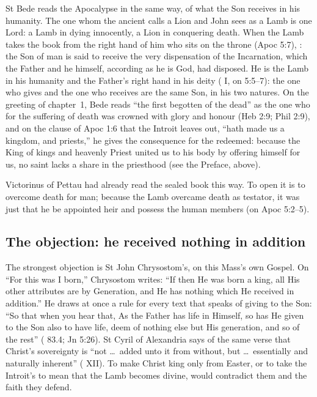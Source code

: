 St Bede reads the Apocalypse in the same way, of what the Son receives in his
humanity. The one whom the ancient calls a Lion and John sees as a Lamb is one
Lord: a Lamb in dying innocently, a Lion in conquering death. When the Lamb
takes the book from the right hand of him who sits on the throne (Apoc 5:7),
: the Son of man is said
to receive the very dispensation of the Incarnation, which the Father and he
himself, according as he is God, had disposed. He is the Lamb in his humanity
and the Father's right hand in his deity ( I, on
5:5--7): the one who gives and the one who receives are the same Son, in his
two natures. On the greeting of chapter~1, Bede reads ``the first begotten of the
dead'' as the one who for the suffering of death was crowned with glory and
honour (Heb 2:9; Phil 2:9), and on the clause of Apoc 1:6 that the Introit
leaves out, ``hath made us a kingdom, and priests,'' he gives the consequence
for the redeemed: because the King of kings and heavenly Priest united us to
his body by offering himself for us, no saint lacks a share in the priesthood
(see the Preface, above).

Victorinus of Pettau had already read the sealed book this way. To open it is
to overcome death for man; because the Lamb overcame death as testator, it was
just that he be appointed heir and possess the human members (on Apoc
5:2--5).

\subsection{The objection: he received nothing in addition}
\label{sec:lamb-objection}

The strongest objection is St John Chrysostom's, on this Mass's own Gospel. On
``For this was I born,'' Chrysostom writes: ``If then He
was born a king, all His other attributes are by Generation, and He has
nothing which He received in addition.'' He draws at once a rule for every text
that speaks of giving to the Son: ``So that when you hear that, As the Father
has life in Himself, so has He given to the Son also to have life, deem of
nothing else but His generation, and so of the rest'' (
83.4; Jn 5:26). St Cyril of Alexandria says of the same verse that Christ's
sovereignty is ``not \dots\ added unto it from without, but \dots\ essentially and
naturally inherent'' ( XII). To make Christ king only
from Easter, or to take the Introit's  to mean that
the Lamb becomes divine, would contradict them and the faith they defend.

